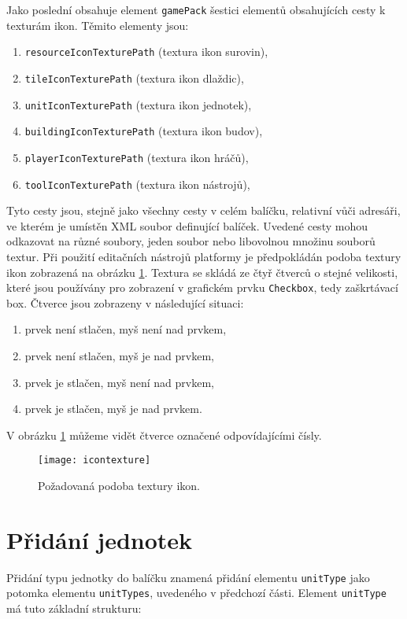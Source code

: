 Jako poslední obsahuje element \texttt{gamePack} šestici elementů obsahujících cesty k texturám ikon. Těmito elementy jsou:
\begin{enumerate}
	\item \texttt{resourceIconTexturePath} (textura ikon surovin),
	\item \texttt{tileIconTexturePath} (textura ikon dlaždic),
	\item \texttt{unitIconTexturePath} (textura ikon jednotek),
	\item \texttt{buildingIconTexturePath} (textura ikon budov),
	\item \texttt{playerIconTexturePath} (textura ikon hráčů),
	\item \texttt{toolIconTexturePath} (textura ikon nástrojů),
\end{enumerate}
Tyto cesty jsou, stejně jako všechny cesty v celém balíčku, relativní vůči adresáři, ve kterém je umístěn XML soubor definující balíček. Uvedené cesty mohou odkazovat na různé soubory, jeden soubor nebo libovolnou množinu souborů textur. Při použití editačních nástrojů platformy je předpokládán podoba textury ikon zobrazená na obrázku \ref{fig:icontexture}. Textura se skládá ze čtyř čtverců o stejné velikosti, které jsou používány pro zobrazení v grafickém prvku \texttt{Checkbox}, tedy zaškrtávací box. Čtverce jsou zobrazeny v následující situaci:
\begin{enumerate}
	\item prvek není stlačen, myš není nad prvkem,
	\item prvek není stlačen, myš je nad prvkem,
	\item prvek je stlačen, myš není nad prvkem,
	\item prvek je stlačen, myš je nad prvkem.
\end{enumerate}

V obrázku \ref{fig:icontexture} můžeme vidět čtverce označené odpovídajícími čísly.

\begin{figure}[h]
	\centering
	\texttt{[image: icontexture]}
	\caption{Požadovaná podoba textury ikon.}
	\label{fig:icontexture}
\end{figure}

\section{Přidání jednotek}
\label{sec:addunit}
Přidání typu jednotky do balíčku znamená přidání elementu \texttt{unitType} jako potomka elementu \texttt{unitTypes}, uvedeného v předchozí části. Element \texttt{unitType} má tuto základní strukturu:

